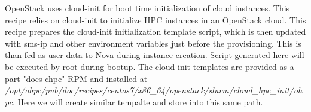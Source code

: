 	OpenStack uses cloud-init for boot time initialization of cloud instances. This recipe relies on cloud-init to initialize HPC instances in an OpenStack cloud. This recipe prepares the cloud-init initialization template script, which is then updated with sms-ip and other environment variables just before the provisioning. This is than fed as user data to Nova during instance creation. Script generated here will be executed by root during bootup. 
The cloud-init templates are provided as a part "docs-chpc" RPM and installed at {\em /opt/ohpc/pub/doc/recipes/centos7/x86\_64/openstack/slurm/cloud\_hpc\_init/ohpc}. Here we will create similar tempalte and store into this same path. 
